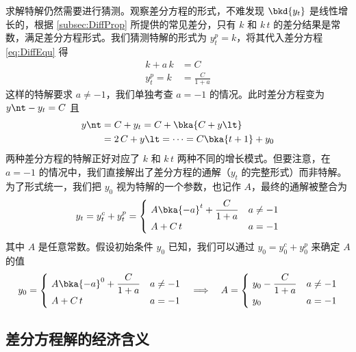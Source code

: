 求解特解仍然需要进行猜测。观察差分方程的形式，不难发现 \(\bkd{y_t}\) 是线性增长的，根据 \ref{subsec:DiffProp} 所提供的常见差分，只有 \(k\) 和 \(k\,t\) 的差分结果是常数，满足差分方程形式。我们猜测特解的形式为 \(y_t^p=k\)，将其代入差分方程 \ref{eq:DiffEqu} 得
\begin{align}
    k + a\,k&=C\\
    y_t^p=k&=\frac C{1+a}
\end{align}
这样的特解要求 \(a\neq -1\)，我们单独考查 \(a=-1\) 的情况。此时差分方程变为 \(y\nt-y_t=C\) 且
\begin{align}
    y\nt &= C + y_t = C + \bka{C + y\lt} \notag\\
    &= 2\,C + y\lt = \cdots = C\bka{t+1} + y_0
\end{align}
两种差分方程的特解正好对应了 \(k\) 和 \(k\,t\) 两种不同的增长模式。但要注意，在 \(a=-1\) 的情况中，我们直接解出了差分方程的通解（\(y_t\) 的完整形式）而非特解。为了形式统一，我们把 \(y_0\) 视为特解的一个参数，也记作 \(A\)，最终的通解被整合为
\begin{equation}
    y_t=y_t^c+y_t^p=\begin{cases}
        \ A\bka{-a}^{t}+\dfrac C{1+a} & a\neq -1\\
        \ A+C\,t & a=-1
    \end{cases}
\end{equation}
其中 \(A\) 是任意常数。假设初始条件 \(y_0\) 已知，我们可以通过 \(y_0=y_0^c+y_0^p\) 来确定 \(A\) 的值
\begin{equation}
    y_0=\begin{cases}
        \ A\bka{-a}^0 + \dfrac C{1+a} & a\neq -1\\
        \ A+C\,t & a=-1
    \end{cases} \quad \Longrightarrow \quad A=\begin{cases}
        \ y_0-\dfrac C{1+a} & a\neq -1\\
        \ y_0 & a=-1
    \end{cases}\label{eq:DiffEquA}
\end{equation}


\subsection{差分方程解的经济含义}\label{subsec:DiffEquSolnMean}

